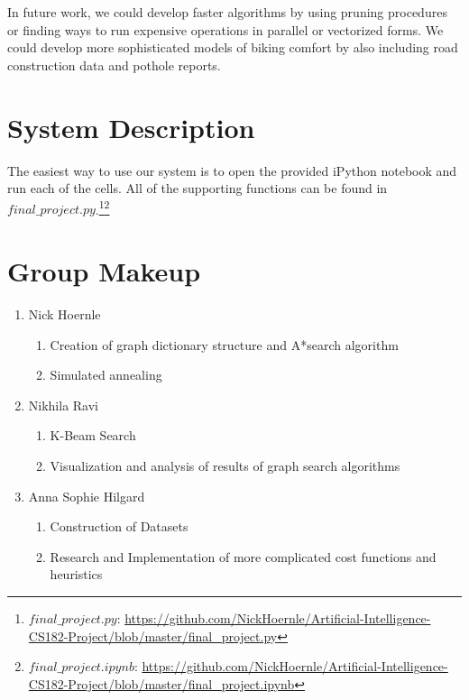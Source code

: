 \documentclass[11pt]{article}
\begin{document}
In future work, we could develop faster algorithms by using pruning procedures or finding ways to run expensive operations in parallel or vectorized forms. We could develop more sophisticated models of biking comfort by also including road construction data and pothole reports.

\appendix

\section{System Description}

The easiest way to use our system is to open the provided iPython notebook and run each of the cells. All of the supporting functions can be found in $final\_project.py$.\footnote{$final\_project.py$: \url{https://github.com/NickHoernle/Artificial-Intelligence-CS182-Project/blob/master/final_project.py}}\footnote{$final\_project.ipynb$: \url{https://github.com/NickHoernle/Artificial-Intelligence-CS182-Project/blob/master/final_project.ipynb}}

\section{Group Makeup}

\begin{enumerate}
\item Nick Hoernle
\begin{enumerate}
\item Creation of graph dictionary structure and A*search algorithm
\item Simulated annealing
\end{enumerate}
\item Nikhila Ravi
\begin{enumerate}
\item K-Beam Search
\item Visualization and analysis of results of graph search algorithms
\end{enumerate}
\item Anna Sophie Hilgard
\begin{enumerate}
\item Construction of Datasets
\item Research and Implementation of more complicated cost functions and heuristics
\end{enumerate}
\end{enumerate}


 

\end{document}
